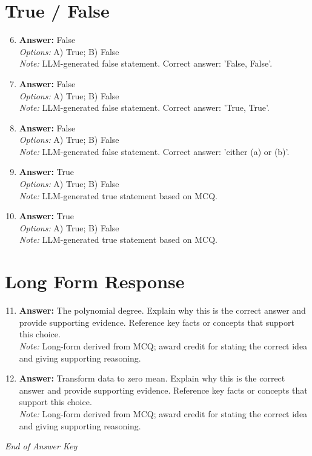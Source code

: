 \documentclass[12pt]{article}
\begin{document}
\section*{True / False}
\begin{enumerate}[label=\arabic*.]
\setcounter{enumi}{5}
\item \textbf{Answer:} False
\\ \textit{Options:} A) True; B) False
\\ \textit{Note:} LLM-generated false statement. Correct answer: 'False, False'.
\item \textbf{Answer:} False
\\ \textit{Options:} A) True; B) False
\\ \textit{Note:} LLM-generated false statement. Correct answer: 'True, True'.
\item \textbf{Answer:} False
\\ \textit{Options:} A) True; B) False
\\ \textit{Note:} LLM-generated false statement. Correct answer: 'either (a) or (b)'.
\item \textbf{Answer:} True
\\ \textit{Options:} A) True; B) False
\\ \textit{Note:} LLM-generated true statement based on MCQ.
\item \textbf{Answer:} True
\\ \textit{Options:} A) True; B) False
\\ \textit{Note:} LLM-generated true statement based on MCQ.
\end{enumerate}

\section*{Long Form Response}
\begin{enumerate}[label=\arabic*.]
\setcounter{enumi}{10}
\item \textbf{Answer:} The polynomial degree. Explain why this is the correct answer and provide supporting evidence. Reference key facts or concepts that support this choice.
\\ \textit{Note:} Long-form derived from MCQ; award credit for stating the correct idea and giving supporting reasoning.
\item \textbf{Answer:} Transform data to zero mean. Explain why this is the correct answer and provide supporting evidence. Reference key facts or concepts that support this choice.
\\ \textit{Note:} Long-form derived from MCQ; award credit for stating the correct idea and giving supporting reasoning.
\end{enumerate}

\vfill
\noindent\textit{End of Answer Key}
\end{document}
